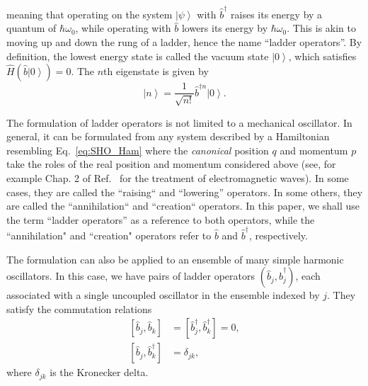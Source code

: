 \documentclass[5p, twocolumn, 10pt, sort&compress]{elsarticle}
\newcommand{\ket}[1]{\left|{#1}\right\rangle}
\newcommand{\comm}[2]{\left[{#1},{#2}\right]}
\newcommand{\bop}{\hat{b}}
\newcommand{\bdag}{\bop^\dagger}
\newcommand{\bdagn}[1]{\bop^{\dagger {#1}}}
\begin{document}
meaning that operating on the system $\ket{\psi}$ with $\bdag$ raises its energy by a quantum of $\hbar\omega_0$, while operating with $\bop$ lowers its energy by $\hbar\omega_0$.  This is akin to moving up and down the rung of a ladder, hence the name ``ladder operators''.  By definition, the lowest energy state is called the vacuum state $\ket{0}$, which satisfies $\hat{H}\left(\bop\ket{0}\right)=0$. The $n$th eigenstate is given by
\begin{equation}
    \ket{n} = \frac{1}{\sqrt{n!}}\bdagn{n}\ket{0}.
\end{equation}

The formulation of ladder operators is not limited to a mechanical oscillator. In general, it can be formulated from any system described by a Hamiltonian resembling Eq.~\eqref{eq:SHO_Ham} where the \emph{canonical} position $q$ and momentum $p$ take the roles of the real position and momentum considered above (see, for example Chap. 2 of Ref.~\cite{gerry_introductory_2005} for the treatment of electromagnetic waves).  In some cases, they are called the ``raising`` and ``lowering'' operators.  In some others, they are called the ``annihilation`` and ``creation`` operators.  In this paper, we shall use the term ``ladder operators'' as a reference to both operators, while the ``annihilation" and ``creation" operators refer to $\bop$ and $\bdag$, respectively.

The formulation can also be applied to an ensemble of many simple harmonic oscillators.  In this case, we have pairs of ladder operators $\left(\bop_j,\bdag_j\right)$, each associated with a single uncoupled oscillator in the ensemble indexed by $j$.  They satisfy the commutation relations
\begin{subequations}
\begin{align}
    \comm{\bop_j}{\bop_k} &= \comm{\bdag_j}{\bdag_k} = 0
    \label{eq:boson_comm_1},
    \\
    \comm{\bop_j}{\bdag_k} &= \delta_{jk},
    \label{eq:boson_comm_2}
\end{align}
\end{subequations}
where $\delta_{jk}$ is the Kronecker delta. 
\end{document}
